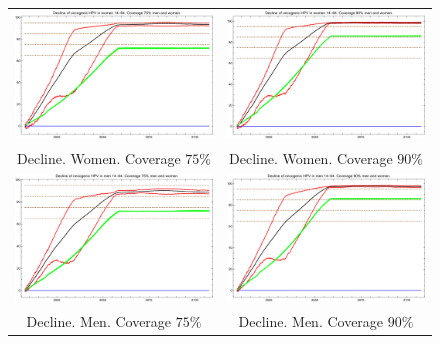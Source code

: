\begin{figure}[!]
	\centering
	\begin{tabular}{cc}
		\includegraphics[width=0.5\linewidth]{IMGs/7.-Erradicacion_ONCO/Decl_muj_14_64_onco_75_75.pdf}	& 
		\includegraphics[width=0.5\linewidth]{IMGs/7.-Erradicacion_ONCO/Decl_muj_14_64_onco_90_90.pdf}  \\ 
		Decline. Women. Coverage $75\%$	& Decline. Women. Coverage $90\%$ \\ 
		\includegraphics[width=0.5\linewidth]{IMGs/7.-Erradicacion_ONCO/Decl_hom_14_64_onco_75_75.pdf}	& 
		\includegraphics[width=0.5\linewidth]{IMGs/7.-Erradicacion_ONCO/Decl_hom_14_64_onco_90_90.pdf}  \\ 
		Decline. Men. Coverage $75\%$	& Decline. Men. Coverage $90\%$ \\ 		

\end{tabular}
\end{figure}
